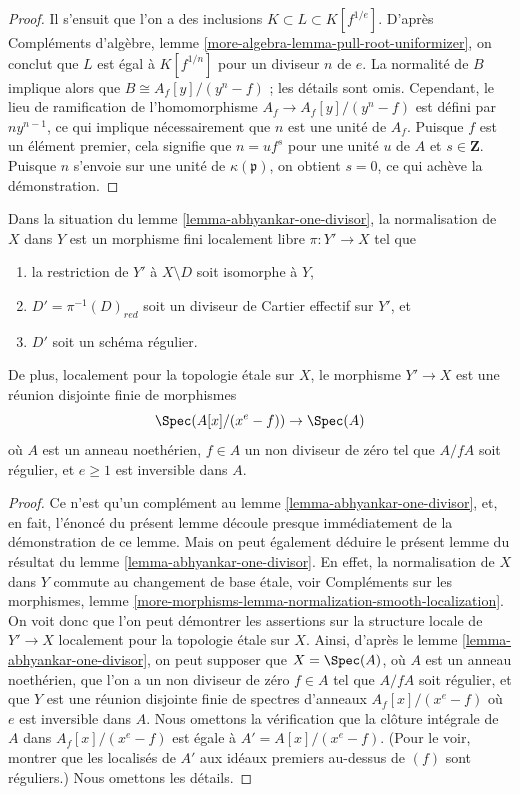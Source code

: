 \begin{proof}
\medskip\noindent
Il s'ensuit que l'on a des inclusions $K \subset L \subset K[f^{1/e}]$.
D'après Compléments d'algèbre, lemme \ref{more-algebra-lemma-pull-root-uniformizer},
on conclut que $L$ est égal à $K[f^{1/n}]$ pour un diviseur $n$ de $e$.
La normalité de $B$ implique alors que $B \cong A_f[y]/(y^n - f)$ ; les détails
sont omis.
Cependant, le lieu de ramification de l'homomorphisme $A_f \to A_f[y]/(y^n - f)$
est défini par $ny^{n - 1}$, ce qui implique nécessairement que $n$ est une unité de $A_f$.
Puisque $f$ est un élément premier, cela signifie que $n = u f^s$ pour
une unité $u$ de $A$ et $s \in \mathbf{Z}$. Puisque $n$ s'envoie sur une unité de
$\kappa(\mathfrak p)$, on obtient $s = 0$, ce qui achève la démonstration.
\end{proof}

\begin{lemma}
\label{lemma-extend-tame-covering-normal}
Dans la situation du lemme \ref{lemma-abhyankar-one-divisor},
la normalisation de $X$ dans $Y$ est un morphisme fini localement libre
$\pi : Y' \to X$ tel que
\begin{enumerate}
\item la restriction de $Y'$ à $X \setminus D$ soit isomorphe à $Y$,
\item $D' = \pi^{-1}(D)_{red}$ soit un diviseur de Cartier effectif sur $Y'$, et
\item $D'$ soit un schéma régulier.
\end{enumerate}
De plus, localement pour la topologie \'etale sur $X$, le morphisme $Y' \to X$ est une réunion
disjointe finie de morphismes
$$
\Spec(A[x]/(x^e - f)) \to \Spec(A)
$$
où $A$ est un anneau noethérien, $f \in A$ un non diviseur de zéro tel que
$A/fA$ soit régulier, et $e \geq 1$ est inversible dans $A$.
\end{lemma}

\begin{proof}
Ce n'est qu'un complément au lemme \ref{lemma-abhyankar-one-divisor},
et, en fait, l'énoncé du présent lemme découle presque immédiatement de
la démonstration de ce lemme. Mais on peut également déduire
le présent lemme du résultat du lemme \ref{lemma-abhyankar-one-divisor}.
En effet, la normalisation de $X$ dans $Y$ commute au
changement de base \'etale, voir Compléments sur les morphismes, lemme
\ref{more-morphisms-lemma-normalization-smooth-localization}.
On voit donc que l'on peut démontrer les assertions sur la structure locale
de $Y' \to X$ localement pour la topologie \'etale sur $X$. Ainsi, d'après le
lemme \ref{lemma-abhyankar-one-divisor}, on peut supposer que
$X = \Spec(A)$, où $A$ est un anneau noethérien, que l'on a un
non diviseur de zéro $f\in A$ tel que $A/fA$ soit régulier, et que $Y$
est une réunion disjointe finie de spectres d'anneaux $A_f[x]/(x^e - f)$
où $e$ est inversible dans $A$. Nous omettons la vérification que
la clôture intégrale de $A$ dans $A_f[x]/(x^e - f)$ est
égale à $A' = A[x]/(x^e - f)$. (Pour le voir, montrer que
les localisés de $A'$ aux idéaux premiers au-dessus de $(f)$ sont réguliers.)
Nous omettons les détails.
\end{proof}

